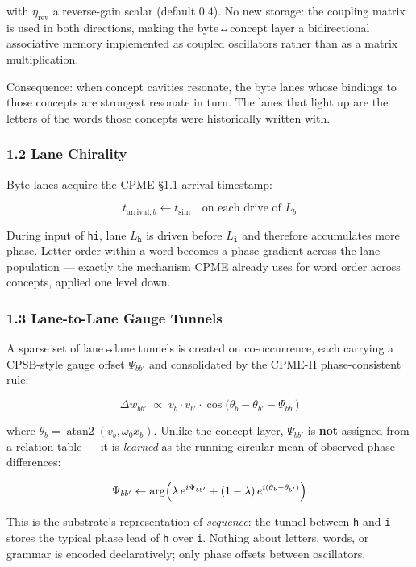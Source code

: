 \documentclass[
  11pt,
  a4paper,
]{article}
\begin{document}
with \(\eta_{\text{rev}}\) a reverse-gain scalar (default \(0.4\)). No
new storage: the coupling matrix is used in both directions, making the
byte↔concept layer a bidirectional associative memory implemented as
coupled oscillators rather than as a matrix multiplication.

Consequence: when concept cavities resonate, the byte lanes whose
bindings to those concepts are strongest resonate in turn. The lanes
that light up are the letters of the words those concepts were
historically written with.

\subsubsection{1.2 Lane Chirality}\label{lane-chirality}

Byte lanes acquire the CPME §1.1 arrival timestamp:

\[ t_{\text{arrival},b} \leftarrow t_{\text{sim}} \quad \text{on each drive of } L_b \]

During input of \texttt{hi}, lane \(L_{\texttt{h}}\) is driven before
\(L_{\texttt{i}}\) and therefore accumulates more phase. Letter order
within a word becomes a phase gradient across the lane population ---
exactly the mechanism CPME already uses for word order across concepts,
applied one level down.

\subsubsection{1.3 Lane-to-Lane Gauge
Tunnels}\label{lane-to-lane-gauge-tunnels}

A sparse set of lane↔lane tunnels is created on co-occurrence, each
carrying a CPSB-style gauge offset \(\Psi_{bb'}\) and consolidated by
the CPME-II phase-consistent rule:

\[ \Delta w_{bb'} \;\propto\; v_b \cdot v_{b'} \cdot \cos\!\bigl(\theta_b - \theta_{b'} - \Psi_{bb'}\bigr) \]

where \(\theta_b = \operatorname{atan2}(v_b, \omega_0 x_b)\). Unlike the
concept layer, \(\Psi_{bb'}\) is \textbf{not} assigned from a relation
table --- it is \emph{learned} as the running circular mean of observed
phase differences:

\[ \Psi_{bb'} \leftarrow \arg\Bigl( \lambda\, e^{i\Psi_{bb'}} + (1-\lambda)\, e^{i(\theta_b - \theta_{b'})} \Bigr) \]

This is the substrate's representation of \emph{sequence}: the tunnel
between \texttt{h} and \texttt{i} stores the typical phase lead of
\texttt{h} over \texttt{i}. Nothing about letters, words, or grammar is
encoded declaratively; only phase offsets between oscillators.
\end{document}
